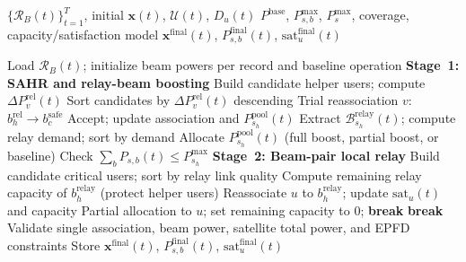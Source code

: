 \begin{algorithm}[H]
\caption{SAPR-R Online Operation}
\label{alg:ch4_en_sapr}
\scriptsize
\begin{algorithmic}[1]
\Require $\{\mathcal{R}_B(t)\}_{t=1}^{T}$, initial $\mathbf{x}(t)$, $\mathcal{U}(t)$, $D_u(t)$
\Require $P^{\mathrm{base}}$, $P_{s,b}^{\max}$, $P_s^{\max}$, coverage, capacity/satisfaction model
\Ensure $\mathbf{x}^{\mathrm{final}}(t)$, $P_{s,b}^{\mathrm{final}}(t)$, $\mathrm{sat}_u^{\mathrm{final}}(t)$

    \State Load $\mathcal{R}_B(t)$; initialize beam powers per record and baseline operation
    \State \textbf{Stage~1: SAHR and relay-beam boosting}
        \State Build candidate helper users; compute $\Delta P_v^{\mathrm{rel}}(t)$
        \State Sort candidates by $\Delta P_v^{\mathrm{rel}}(t)$ descending
            \State Trial reassociation $v$: $b_h^{\mathrm{rel}}\to b_c^{\mathrm{safe}}$
                \State Accept; update association and $P_{s_h}^{\mathrm{pool}}(t)$
            \EndIf
        \EndFor
    \EndFor
        \State Extract $\mathcal{B}_{s_h}^{\mathrm{relay}}(t)$; compute relay demand; sort by demand
            \State Allocate $P_{s_h}^{\mathrm{pool}}(t)$ (full boost, partial boost, or baseline)
        \EndFor
        \State Check $\sum_b P_{s,b}(t)\le P_{s_h}^{\max}$
    \EndFor
    \State \textbf{Stage~2: Beam-pair local relay}
        \State Build candidate critical users; sort by relay link quality
        \State Compute remaining relay capacity of $b_h^{\mathrm{relay}}$ (protect helper users)
                \State Reassociate $u$ to $b_h^{\mathrm{relay}}$; update $\mathrm{sat}_u(t)$ and capacity
                \State Partial allocation to $u$; set remaining capacity to $0$; \textbf{break}
            \Else
                \State \textbf{break}
            \EndIf
        \EndFor
    \EndFor
    \State Validate single association, beam power, satellite total power, and EPFD constraints
    \State Store $\mathbf{x}^{\mathrm{final}}(t)$, $P_{s,b}^{\mathrm{final}}(t)$, $\mathrm{sat}_u^{\mathrm{final}}(t)$
\EndFor
\end{algorithmic}
\end{algorithm}

